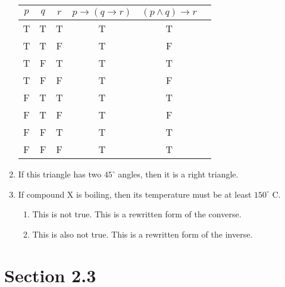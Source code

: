 \documentclass{article}
\makeatletter
\newcommand\setItemnumber[1]{\setcounter{enum\romannumeral\@enumdepth}{\numexpr#1-1\relax}}
\makeatother
\begin{document}
\begin{enumerate}
\begin{tabular}{|c|c|c|c|c|c|}
  $p$ & $q$ & $r$ & $p \rightarrow (q \rightarrow r)$ & $(p \land q) \rightarrow r$ \\
  \hline
  T & T & T & T & T \\
  T & T & F & T & F \\
  T & F & T & T & T \\
  T & F & F & T & F \\
  F & T & T & T & T \\
  F & T & F & T & F \\
  F & F & T & T & T \\
  F & F & F & T & T \\

\end{tabular}
  \setItemnumber{41}
  \item If this triangle has two $45^{\circ}$ angles, then it is a right triangle.
  \setItemnumber{46}
  \item If compound X is boiling, then its temperature must be at least $150^{\circ}$ C. 
  \begin{enumerate}
      \setItemnumber{3}
      \item This is not true. This is a rewritten form of the converse.
      \item This is also not true. This is a rewritten form of the inverse.
  \end{enumerate}
\end{enumerate}
\section{Section 2.3}
\end{document}
